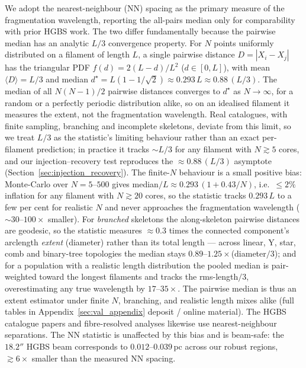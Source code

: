 \documentclass[usenatbib,twoside,twocolumn]{mnras}
\begin{document}
We adopt the nearest-neighbour (NN) spacing as the primary measure of the fragmentation wavelength, reporting the all-pairs median only for comparability with prior HGBS work. The two differ fundamentally because the pairwise median has an analytic $L/3$ convergence property. For $N$ points uniformly distributed on a filament of length $L$, a single pairwise distance $D=|X_i-X_j|$ has the triangular PDF $f(d)=2(L-d)/L^2$ ($d\in[0,L]$), with mean $\langle D\rangle=L/3$ and median $d^\star=L(1-1/\sqrt{2})\approx0.293\,L\approx0.88\,(L/3)$. The median of all $N(N-1)/2$ pairwise distances converges to $d^\star$ as $N\to\infty$, for a random or a perfectly periodic distribution alike, so on an idealised filament it measures the extent, not the fragmentation wavelength. Real catalogues, with finite sampling, branching and incomplete skeletons, deviate from this limit, so we treat $L/3$ as the statistic's limiting behaviour rather than an exact per-filament prediction; in practice it tracks $\sim L/3$ for any filament with $N\gtrsim5$ cores, and our injection--recovery test reproduces the $\approx0.88\,(L/3)$ asymptote (Section~\ref{sec:injection_recovery}). The finite-$N$ behaviour is a small positive bias: Monte-Carlo over $N=5$--$500$ gives median$/L\approx0.293\,(1+0.43/N)$, i.e.\ $\le2\%$ inflation for any filament with $N\gtrsim20$ cores, so the statistic tracks $0.293\,L$ to a few per cent for realistic $N$ and never approaches the fragmentation wavelength ($\sim30$--$100\times$ smaller). For \emph{branched} skeletons the along-skeleton pairwise distances are geodesic, so the statistic measures $\approx0.3$ times the connected component's arclength \emph{extent} (diameter) rather than its total length --- across linear, Y, star, comb and binary-tree topologies the median stays $0.89$--$1.25\times$(diameter$/3$); and for a population with a realistic length distribution the pooled median is pair-weighted toward the longest filaments and tracks the rms-length$/3$, overestimating any true wavelength by $17$--$35\times$. The pairwise median is thus an extent estimator under finite $N$, branching, and realistic length mixes alike (full tables in Appendix~\ref{sec:val_appendix} deposit / online material). The HGBS catalogue papers \citep{Konyves2015,Konyves2020} and fibre-resolved analyses \citep{Hacar2013,Hacar2018} likewise use nearest-neighbour separations. The NN statistic is unaffected by this bias and is beam-safe: the $18.2''$ HGBS beam corresponds to $0.012$--$0.039$\,pc across our robust regions, $\gtrsim6\times$ smaller than the measured NN spacing.
\end{document}
